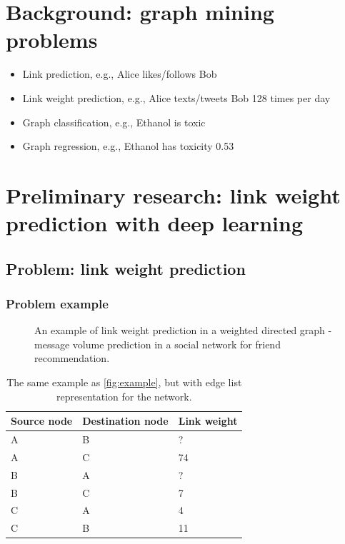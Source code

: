 \documentclass{article}
\begin{document}
\begin{landscape}
\pagebreak
\section{Background: graph mining problems}
\begin{itemize}
	\item Link prediction, e.g., Alice likes/follows Bob
	\item Link weight prediction, e.g., Alice texts/tweets Bob 128 times per day
	\item Graph classification, e.g., Ethanol is toxic
	\item Graph regression, e.g., Ethanol has toxicity 0.53
\end{itemize}

\pagebreak
\section{Preliminary research: link weight prediction with deep learning}

\subsection{Problem: link weight prediction}

\subsubsection{Problem example}
\begin{figure}[H]\centering
	\caption{
		An example of link weight prediction in a weighted directed graph -
		message volume prediction in a social network for friend recommendation.
	}
	\label{fig:example}
\end{figure}
\begin{table}[H]\centering
	\caption{
		The same example as \autoref{fig:example}, but with edge list representation for the network.
	}
	\begin{tabularx}{0.6\textwidth}{|X|X|X|}  \hline
		Source node & Destination node & Link weight \\ \hline
		A & B & ? \\ \hline
		A & C & 74 \\ \hline
		B & A & ? \\ \hline
		B & C & 7 \\ \hline
		C & A & 4 \\ \hline
		C & B & 11 \\ \hline
	\end{tabularx}
	\label{tab:example}
\end{table}


\end{landscape}
\end{document}

